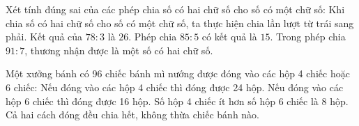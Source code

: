 \begin{ex} %
Xét tính đúng sai của các phép chia số có hai chữ số cho số có một chữ số:
\choiceTF
{\True Khi chia số có hai chữ số cho số có một chữ số, ta thực hiện chia lần lượt từ trái sang phải.}
{\True Kết quả của $78 : 3$ là $26$.}
{Phép chia $85 : 5$ có kết quả là $15$.}
{\True Trong phép chia $91 : 7$, thương nhận được là một số có hai chữ số.}
\end{ex}

\begin{ex} %
Một xưởng bánh có 96 chiếc bánh mì nướng được đóng vào các hộp 4 chiếc hoặc 6 chiếc:
\choiceTF
{\True Nếu đóng vào các hộp 4 chiếc thì đóng được 24 hộp.}
{\True Nếu đóng vào các hộp 6 chiếc thì đóng được 16 hộp.}
{Số hộp 4 chiếc ít hơn số hộp 6 chiếc là 8 hộp.}
{\True Cả hai cách đóng đều chia hết, không thừa chiếc bánh nào.}
\end{ex}


